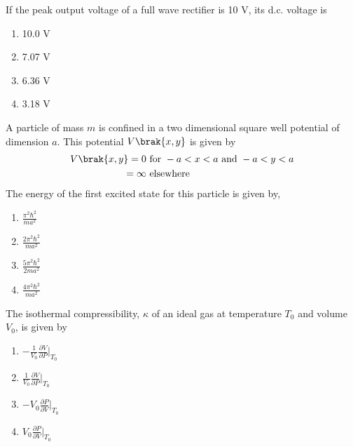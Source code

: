 \item If the peak output voltage of a full wave rectifier is 10 V, its d.c. voltage is
\begin{multicols}{2}
    \begin{enumerate}
        \item 10.0 V
        \item 7.07 V
        \item 6.36 V
        \item 3.18 V
    \end{enumerate}
\end{multicols}

\item A particle of mass $m$ is confined in a two dimensional square well potential of dimension $a$. This
potential $V\brak{x,y}$ is given by
\begin{align*}
    V\brak{x,y} = 0 & \text{ for } -a < x < a \text{ and } -a < y < a\\
    = \infty &  \text{ elsewhere}
\end{align*}
The energy of the first excited state for this particle is given by,
\begin{multicols}{2}
    \begin{enumerate}
        \item $\frac{\pi^2 \hbar^2}{m a^2}$
        \item $\frac{2 \pi^2 \hbar^2}{m a^2}$
        \item $\frac{5 \pi^2 \hbar^2}{2 m a^2}$
        \item $\frac{4 \pi^2 \hbar^2}{m a^2}$
    \end{enumerate}
\end{multicols}

\item The isothermal compressibility, $\kappa$ of an ideal gas at temperature $T_0$ and volume $V_0$, is given by
\begin{multicols}{2}
    \begin{enumerate}
        \item $-\frac{1}{V_0} \frac{\partial V}{\partial P} \Big|_{T_0}$
        \item $\frac{1}{V_0} \frac{\partial V}{\partial P} \Big|_{T_0}$
        \item $-V_0 \frac{\partial P}{\partial V} \Big|_{T_0}$
        \item $V_0 \frac{\partial P}{\partial V} \Big|_{T_0}$
    \end{enumerate}
\end{multicols}

